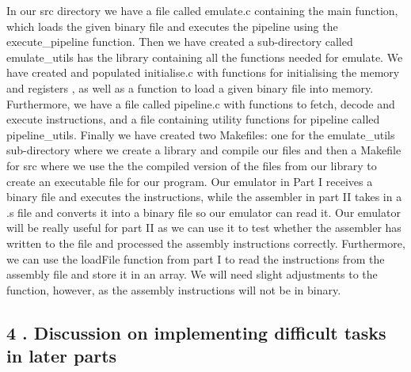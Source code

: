 \documentclass[a4paper]{article}
\begin{document}
In our src directory we have a file called emulate.c containing the main function, 
which loads the given binary file and executes the pipeline using the execute{\_}pipeline function. 
Then we have created a sub-directory called emulate{\_}utils has the library containing all the functions needed
for emulate. We have created and populated initialise.c with functions for initialising the memory and registers
, as well as a function to load a given binary file into memory. Furthermore, we have a file called pipeline.c
with functions to fetch, decode and execute instructions, and a file containing utility functions for pipeline
called pipeline{\_}utils. Finally we have created two Makefiles: one for the emulate{\_}utils sub-directory where we create a library 
and compile our files and then a Makefile for src where we use the the compiled version of the files from our library 
to create an executable file for our program. Our emulator in Part I receives a binary file and executes the instructions, 
while the assembler in part II takes in a .s file and converts it into a binary file so our emulator can read it. Our emulator 
will be really useful for part II as we can use it to test whether the assembler has written to the file and processed
the assembly instructions correctly. Furthermore, we can use the loadFile function from part I to read the instructions
from the assembly file and store it in an array. We will need slight adjustments to the function, however, as the assembly
instructions will not be in binary.

\bigskip
\subsection*{4 . Discussion on implementing difficult tasks in later parts}
\end{document}
